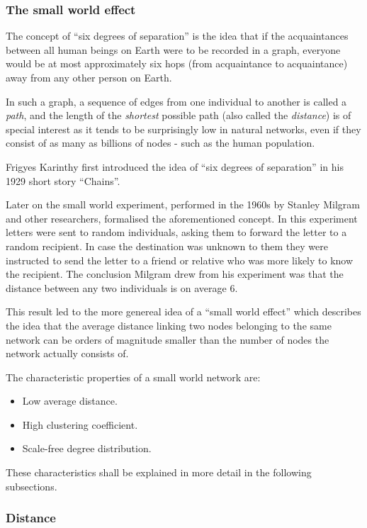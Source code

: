 \documentclass[a4paper,11pt,titlepage]{article}
\begin{document}
\subsubsection{The small world effect}

The concept of ``six degrees of separation'' is the idea that if the
acquaintances between all human beings on Earth were to be recorded
in a graph, everyone would be at most approximately six hops (from
acquaintance to acquaintance) away from any other person on Earth.

In such a graph, a sequence of edges from one individual to another is
called a \emph{path}, and the length of the \emph{shortest} possible path
(also called the \emph{distance}) is of special interest as it tends to
be surprisingly low in natural networks, even if they consist of as many
as billions of nodes - such as the human population.

Frigyes Karinthy first introduced the idea of ``six degrees of separation''
in his 1929 short story ``Chains''.

Later on the small world experiment, performed in the 1960s by
Stanley Milgram and other researchers, formalised the
aforementioned concept. In this experiment letters were
sent to random individuals, asking them to forward the letter to a
random recipient. In case the destination was unknown to them
they were instructed to send the letter to a friend or
relative who was more likely to know the recipient.
The conclusion Milgram drew from his experiment was that the
distance between any two individuals is on average $6$.

This result led to the more genereal idea of a ``small world effect'' which
describes the idea that the average distance linking two nodes belonging to
the same network can be orders of magnitude smaller than the number of nodes
the network actually consists of. \cite{complexAdapt}

The characteristic properties of a small world network are:

\begin{itemize}
  \item Low average distance.
  \item High clustering coefficient.
  \item Scale-free degree distribution.
\end{itemize}

These characteristics shall be explained in more detail in the following subsections.

\subsubsection{Distance}
\end{document}
